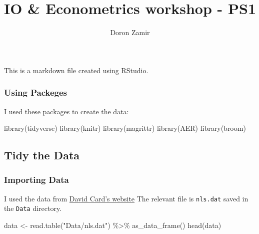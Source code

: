 \documentclass[
]{article}
\title{IO \& Econometrics workshop - PS1}
\author{Doron Zamir}
\date{}
\newenvironment{Shaded}{\begin{snugshade}}{\end{snugshade}}
\newcommand{\FunctionTok}[1]{\textcolor[rgb]{0.00,0.00,0.00}{#1}}
\newcommand{\NormalTok}[1]{#1}
\newcommand{\OtherTok}[1]{\textcolor[rgb]{0.56,0.35,0.01}{#1}}
\newcommand{\SpecialCharTok}[1]{\textcolor[rgb]{0.00,0.00,0.00}{#1}}
\newcommand{\StringTok}[1]{\textcolor[rgb]{0.31,0.60,0.02}{#1}}
\begin{document}
\maketitle

This is a markdown file created using RStudio.

\hypertarget{using-packeges}{%
\subsubsection{Using Packeges}\label{using-packeges}}

I used these packages to create the data:

\begin{Shaded}
\begin{Highlighting}[]
\FunctionTok{library}\NormalTok{(tidyverse)}
\FunctionTok{library}\NormalTok{(knitr)}
\FunctionTok{library}\NormalTok{(magrittr)}
\FunctionTok{library}\NormalTok{(AER)}
\FunctionTok{library}\NormalTok{(broom)}
\end{Highlighting}
\end{Shaded}

\hypertarget{tidy-the-data}{%
\subsection{Tidy the Data}\label{tidy-the-data}}

\hypertarget{importing-data}{%
\subsubsection{Importing Data}\label{importing-data}}

I used the data from
\href{https://davidcard.berkeley.edu/data_sets.html}{David Card's
website} The relevant file is \texttt{nls.dat} saved in the
\texttt{Data} directory.

\begin{Shaded}
\begin{Highlighting}[]
\NormalTok{data }\OtherTok{\textless{}{-}} \FunctionTok{read.table}\NormalTok{(}\StringTok{"Data/nls.dat"}\NormalTok{) }\SpecialCharTok{\%\textgreater{}\%} \FunctionTok{as\_data\_frame}\NormalTok{()}
\FunctionTok{head}\NormalTok{(data)}
\end{Highlighting}
\end{Shaded}
\end{document}
